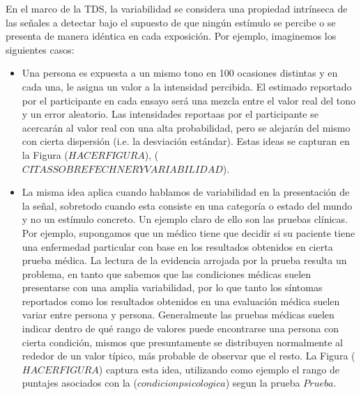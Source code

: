 \begin{itemize}
\begin{itemize}
En el marco de la TDS, la variabilidad se considera una propiedad intrínseca de las señales a detectar bajo el supuesto de que ningún estímulo se percibe o se presenta de manera idéntica en cada exposición. Por ejemplo, imaginemos los siguientes casos: 

\begin{itemize}

\item Una persona es expuesta a un mismo tono en 100 ocasiones distintas y en cada una, le asigna un valor a la intensidad percibida. El estimado reportado por el participante en cada ensayo será una mezcla entre el valor real del tono y un error aleatorio. Las intensidades reportaas por el participante se acercarán al valor real con una alta probabilidad, pero se alejarán del mismo con cierta dispersión (i.e. la desviación estándar). Estas ideas se capturan en la Figura ($HACER FIGURA$), ($CITAS SOBRE FECHNER Y VARIABILIDAD$).\\

\item La misma idea aplica cuando hablamos de variabilidad en la presentación de la señal, sobretodo cuando esta consiste en una categoría o estado del mundo y no un estímulo concreto. Un ejemplo claro de ello son las pruebas clínicas. Por ejemplo, supongamos que un médico tiene que decidir si su paciente tiene una enfermedad particular con base en los resultados obtenidos en cierta prueba médica. La lectura de la evidencia arrojada por la prueba resulta un problema, en tanto que sabemos que las condiciones médicas suelen presentarse con una amplia variabilidad, por lo que tanto los síntomas reportados como los resultados obtenidos en una evaluación médica suelen variar entre persona y persona. Generalmente las pruebas médicas suelen indicar dentro de qué rango de valores puede encontrarse una persona con cierta condición, mismos que presuntamente se distribuyen normalmente al rededor de un valor típico, más probable de observar que el resto. La Figura ($HACER FIGURA$) captura esta idea, utilizando como ejemplo el rango de puntajes asociados con la ($condicion psicologica$) segun la prueba $Prueba$.\\



\end{itemize}


\end{itemize}
\end{itemize}
